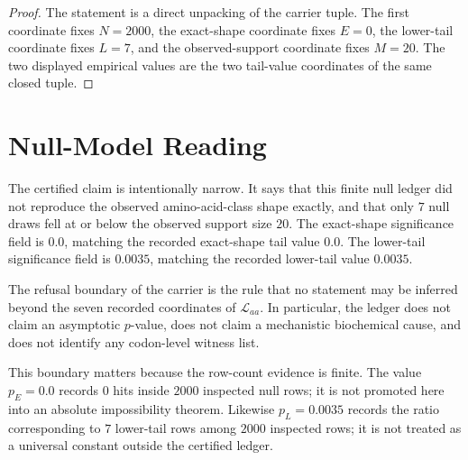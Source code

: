 \begin{proof}
The statement is a direct unpacking of the carrier tuple.  The first coordinate fixes $N=2000$, the exact-shape coordinate fixes $E=0$, the lower-tail coordinate fixes $L=7$, and the observed-support coordinate fixes $M=20$.  The two displayed empirical values are the two tail-value coordinates of the same closed tuple.
\end{proof}

\section{Null-Model Reading}
\label{sec:bioreality-q-six-aa-class-null-ledger-null-reading}

The certified claim is intentionally narrow.  It says that this finite null ledger did not reproduce the observed amino-acid-class shape exactly, and that only $7$ null draws fell at or below the observed support size $20$.  The exact-shape significance field is $0.0$, matching the recorded exact-shape tail value $0.0$.  The lower-tail significance field is $0.0035$, matching the recorded lower-tail value $0.0035$.

\begin{definition}
\label{def:bioreality-q-six-aa-class-null-ledger-refusal-boundary}
The refusal boundary of the carrier is the rule that no statement may be inferred beyond the seven recorded coordinates of $\mathcal{L}_{aa}$.  In particular, the ledger does not claim an asymptotic $p$-value, does not claim a mechanistic biochemical cause, and does not identify any codon-level witness list.
\end{definition}

This boundary matters because the row-count evidence is finite.  The value $p_E=0.0$ records $0$ hits inside $2000$ inspected null rows; it is not promoted here into an absolute impossibility theorem.  Likewise $p_L=0.0035$ records the ratio corresponding to $7$ lower-tail rows among $2000$ inspected rows; it is not treated as a universal constant outside the certified ledger.


